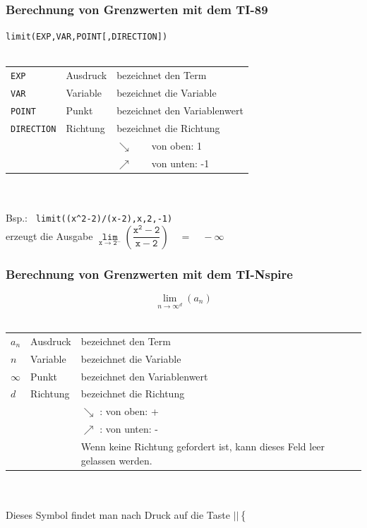 \subsubsection{Berechnung von Grenzwerten mit dem TI-89}\label{subsubsec:limti}
\verb?limit(EXP,VAR,POINT[,DIRECTION])?\\\\
\begin{tabular}{@{}lll}
\verb|EXP|	& Ausdruck	& bezeichnet den Term \\
\verb|VAR|	& Variable	& bezeichnet die Variable \\
\verb|POINT|	& Punkt		& bezeichnet den Variablenwert \\
\verb|DIRECTION|& Richtung 	& bezeichnet die Richtung \\
		&		& $\searrow$~~~~von oben: 1 \\
		&		& $\nearrow$~~~~von unten: -1 \\
\end{tabular}\\\\
Bsp.: \verb| limit((x^2-2)/(x-2),x,2,-1)| \\
\indent\indent erzeugt die Ausgabe $\mathtt{ \lim\limits_{x \rightarrow 2^-} 
(\dfrac{x^2-2}{x-2}) \quad = \quad - \infty } $
\fi
\iftiboth
\newpage
\fi
\ifnspire
\subsubsection{Berechnung von Grenzwerten mit dem TI-Nspire}
\label{subsubsec:limnspire}
\[ \lim\limits_{\boxed{n}\to\boxed{\infty}^{\boxed{d}}}(\boxed{a_n}) \]\\
\begin{tabular}{@{}llp{6cm}}
$\boxed{a_n}$    & Ausdruck & bezeichnet den Term \\
$\boxed{n}$      & Variable & bezeichnet die Variable \\
$\boxed{\infty}$ & Punkt    & bezeichnet den Variablenwert \\
$\boxed{d}$      & Richtung & bezeichnet die Richtung \\
                 &          & $\searrow$ : von oben: + \\
                 &          & $\nearrow$ : von unten: - \\
		 &          & Wenn keine Richtung gefordert ist, kann dieses Feld leer 
         gelassen werden. 
\end{tabular}\\\\
Dieses Symbol findet man nach Druck auf die Taste $\boxed{\boxed{|\boxed{}|
\left\{\frac{\boxed{}}{\boxed{}}\right.}}$
\fi

